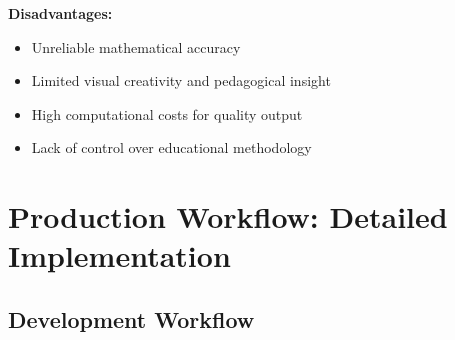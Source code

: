 \documentclass[12pt,a4paper]{article}
\begin{document}
\textbf{Disadvantages:}
\begin{itemize}
    \item Unreliable mathematical accuracy
    \item Limited visual creativity and pedagogical insight
    \item High computational costs for quality output
    \item Lack of control over educational methodology
\end{itemize}

\section{Production Workflow: Detailed Implementation}

\subsection{Development Workflow}
\end{document}
